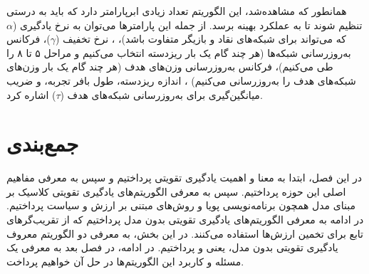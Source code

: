 همانطور که مشاهده‌شد، این الگوریتم تعداد زیادی ابرپارامتر دارد که باید به درستی تنظیم شوند تا به عملکرد بهینه برسد.
از جمله این پارامتر‌ها می‌توان به نرخ یادگیری ($\alpha$ که می‌تواند برای شبکه‌های نقاد و بازیگر متفاوت باشد)،
، نرخ تخفیف ($\gamma$)،
فرکانس به‌روزرسانی شبکه‌ها (هر چند گام یک بار ریزدسته انتخاب می‌کنیم و مراحل ۵ تا ۸ را طی می‌کنیم)،
فرکانس به‌روزرسانی وزن‌های هدف (هر چند گام یک بار وزن‌های شبکه‌های هدف را به‌روزرسانی می‌کنیم)
 ، اندازه ریزدسته، طول بافر تجربه، و ضریب میانگین‌گیری برای به‌روزرسانی شبکه‌های هدف ($\tau$)
  اشاره کرد.
\section{جمع‌بندی}
در این فصل، ابتدا به معنا و اهمیت یادگیری تقویتی پرداختیم و سپس به معرفی مفاهیم اصلی این حوزه پرداختیم.
سپس به معرفی الگوریتم‌های یادگیری تقویتی کلاسیک بر مبنای مدل همچون برنامه‌نویسی پویا و روش‌های مبتنی بر ارزش و سیاست پرداختیم.
در ادامه به معرفی الگوریتم‌های یادگیری تقویتی بدون مدل پرداختیم که از تقریب‌گر‌های تابع برای تخمین ارزش‌ها استفاده می‌کنند.
در این بخش، به معرفی دو الگوریتم معروف یادگیری تقویتی بدون مدل، یعنی  و  پرداختیم.
در ادامه، در فصل بعد به معرفی یک مسئله و کاربرد این الگوریتم‌ها در حل آن خواهیم پرداخت.
